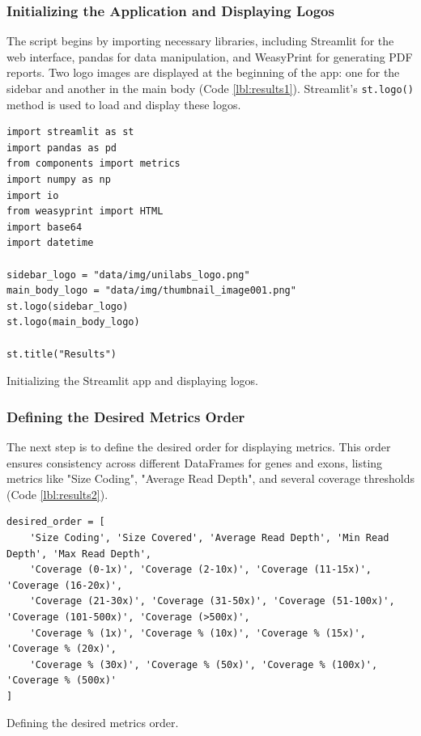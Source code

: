 \subsubsection{\textbf{Initializing the Application and Displaying Logos}}

The script begins by importing necessary libraries, including Streamlit for the web interface, pandas for data manipulation, and WeasyPrint for generating PDF reports. Two logo images are displayed at the beginning of the app: one for the sidebar and another in the main body (Code \ref{lbl:results1}). Streamlit's \texttt{st.logo()} method is used to load and display these logos.

\begin{longlisting}
\begin{verbatim}
import streamlit as st
import pandas as pd
from components import metrics
import numpy as np
import io
from weasyprint import HTML
import base64
import datetime

sidebar_logo = "data/img/unilabs_logo.png"
main_body_logo = "data/img/thumbnail_image001.png"
st.logo(sidebar_logo)
st.logo(main_body_logo)

st.title("Results")
\end{verbatim}
\caption{Initializing the Streamlit app and displaying logos.}
\label{lbl:results1}
\end{longlisting}

\subsubsection{\textbf{Defining the Desired Metrics Order}}

The next step is to define the desired order for displaying metrics. This order ensures consistency across different DataFrames for genes and exons, listing metrics like "Size Coding", "Average Read Depth", and several coverage thresholds (Code \ref{lbl:results2}). 

\begin{longlisting}
\begin{verbatim}
desired_order = [
    'Size Coding', 'Size Covered', 'Average Read Depth', 'Min Read Depth', 'Max Read Depth',
    'Coverage (0-1x)', 'Coverage (2-10x)', 'Coverage (11-15x)', 'Coverage (16-20x)',
    'Coverage (21-30x)', 'Coverage (31-50x)', 'Coverage (51-100x)', 'Coverage (101-500x)', 'Coverage (>500x)',
    'Coverage % (1x)', 'Coverage % (10x)', 'Coverage % (15x)', 'Coverage % (20x)',
    'Coverage % (30x)', 'Coverage % (50x)', 'Coverage % (100x)', 'Coverage % (500x)'
]
\end{verbatim}
\caption{Defining the desired metrics order.}
\label{lbl:results2}
\end{longlisting}

